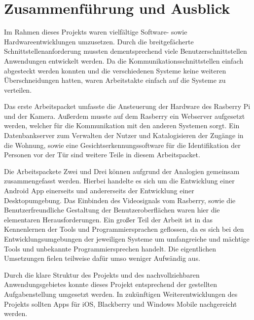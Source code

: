 
\chapter{Zusammenführung und Ausblick}
Im Rahmen dieses Projekts waren vielfältige Software- sowie Hardwareentwicklungen umzusetzen. Durch die breitgefächerte Schnittstellenanforderung mussten dementsprechend viele Benutzerschnittstellen Anwendungen entwickelt werden. Da die Kommunikationsschnittstellen einfach abgesteckt werden konnten und die verschiedenen Systeme keine weiteren Überschneidungen hatten, waren Arbeitstakte einfach auf die Systeme zu verteilen. 
\par
Das erste Arbeitspacket umfasste die Ansteuerung der Hardware des Rasberry Pi und der Kamera. Außerdem musste auf dem Rasberry ein Webserver aufgesetzt werden, welcher für die Kommunikation mit den anderen Systemen sorgt. Ein Datenbankserver zum Verwalten der Nutzer und Katalogisieren der Zugänge in die Wohnung, sowie eine Gesichtserkennungssoftware für die Identifikation der Personen vor der Tür sind weitere Teile in diesem Arbeitspacket.
\par
Die Arbeitspackete Zwei und Drei können aufgrund der Analogien gemeinsam zusammengefasst werden. Hierbei handelte es sich um die Entwicklung einer Android App einerseits und andererseits der Entwicklung einer Desktopumgebung. Das Einbinden des Videosignals vom Rasberry, sowie die Benutzerfreundliche Gestaltung der Benutzeroberflächen waren hier die elementaren Herausforderungen. Ein großer Teil der Arbeit ist in das Kennenlernen der Tools und Programmiersprachen geflossen, da es sich bei den Entwicklungsumgebungen der jeweiligen Systeme um umfangreiche und mächtige Tools und unbekannte Programmiersprechen handelt. Die eigentlichen Umsetzungen fielen teilweise dafür umso weniger Aufwändig aus. 
\par
Durch die klare Struktur des Projekts und des nachvollziehbaren Anwendungsgebietes konnte dieses Projekt entsprechend der gestellten Aufgabenstellung umgesetzt werden. In zukünftigen Weiterentwicklungen des Projekts sollten Apps für iOS, Blackberry und Windows Mobile nachgereicht werden. 
